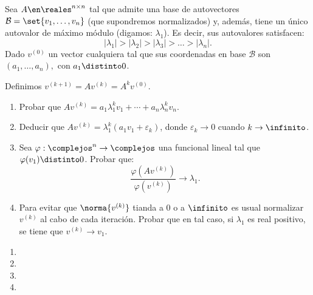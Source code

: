\begin{enunciado}{\ejercicio}
  Sea $A \en \reales^{n \times n}$ tal que admite una base de autovectores $\mathcal{B} = \set{v_1, \ldots, v_n}$
  (que supondremos normalizados) y, además, tiene un único autovalor de máximo módulo (digamos: $\lambda_1$).
  Es decir, sus autovalores satisfacen:
  $$
    |\lambda_1| >
    |\lambda_2| >
    |\lambda_3| >
    \dots >
    |\lambda_n|.
  $$
  Dado $v^{(0)}$ un vector cualquiera tal que sus coordenadas en base $\mathcal{B}$ son $(a_1, \ldots, a_n),$ con $a_1 \distinto 0$.

  Definimos $v^{(k+1)} = Av^{(k)} = A^k v^{(0)}$.

  \begin{enumerate}[label=\alph*)]
    \item Probar que $A v^{(k)} = a_1 \lambda_1^k v_1 + \cdots + a_n \lambda_n^k v_n$.

    \item Deducir que $Av^{(k)} = \lambda_1^k(a_1v_1 + \varepsilon_k)$, donde $\varepsilon_k \to 0$ cuando $k \to \infinito$.

    \item Sea $\varphi : \complejos^n \to \complejos$ una funcional lineal tal que $\varphi(v_1) \distinto 0$. Probar que:
          $$
            \frac{\varphi(Av^{(k)})}{\varphi(v^{(k)})} \to \lambda_1.
          $$

    \item Para evitar que $\norma{v^{(k)}}$ tianda a $0$ o a $\infinito$ es usual normalizar $v^{(k)}$ al cabo de cada iteración.
          Probar que en tal caso, si $\lambda_1$ es real positivo, se tiene que $v^{(k)} \to v_1$.
  \end{enumerate}
\end{enunciado}

\begin{enumerate}[label=\alph*)]
  \item \hacer
  \item \hacer
  \item \hacer
  \item \hacer
\end{enumerate}
